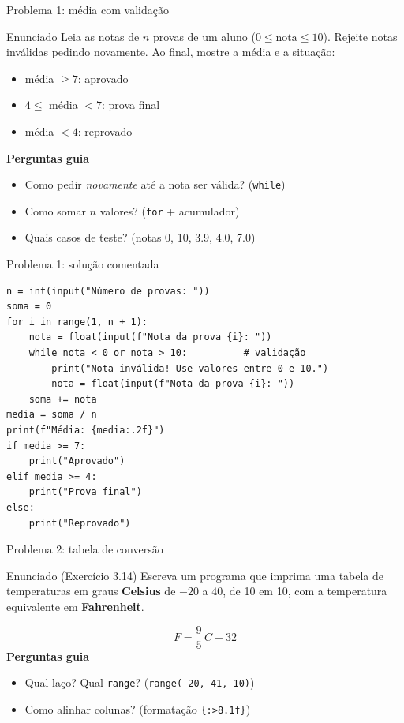 \documentclass[aspectratio=169,10pt,t]{beamer}
\begin{document}
\begin{frame}{Problema 1: média com validação}
  \begin{exampleblock}{Enunciado}
    Leia as notas de \(n\) provas de um aluno (\(0 \le \text{nota} \le 10\)). Rejeite notas inválidas pedindo novamente. Ao final, mostre a média e a situação:
    \begin{itemize}\small
      \item média \(\ge 7\): aprovado
      \item \(4 \le\) média \(< 7\): prova final
      \item média \(< 4\): reprovado
    \end{itemize}
  \end{exampleblock}
  \textbf{Perguntas guia}
  \begin{itemize}
    \item Como pedir \emph{novamente} até a nota ser válida? \hfill (\texttt{while})
    \item Como somar \(n\) valores? \hfill (\texttt{for} + acumulador)
    \item Quais casos de teste? \hfill (notas 0, 10, 3.9, 4.0, 7.0)
  \end{itemize}
\end{frame}

\begin{frame}[fragile]{Problema 1: solução comentada}
\begin{lstlisting}
n = int(input("Número de provas: "))
soma = 0
for i in range(1, n + 1):
    nota = float(input(f"Nota da prova {i}: "))
    while nota < 0 or nota > 10:          # validação
        print("Nota inválida! Use valores entre 0 e 10.")
        nota = float(input(f"Nota da prova {i}: "))
    soma += nota
media = soma / n
print(f"Média: {media:.2f}")
if media >= 7:
    print("Aprovado")
elif media >= 4:
    print("Prova final")
else:
    print("Reprovado")
\end{lstlisting}
\end{frame}

\begin{frame}{Problema 2: tabela de conversão}
  \begin{exampleblock}{Enunciado (Exercício 3.14)}
    Escreva um programa que imprima uma tabela de temperaturas em graus \textbf{Celsius} de \(-20\) a \(40\), de 10 em 10, com a temperatura equivalente em \textbf{Fahrenheit}.
  \end{exampleblock}
  \[ F = \frac{9}{5}\,C + 32 \]
  \textbf{Perguntas guia}
  \begin{itemize}
    \item Qual laço? Qual \texttt{range}? \hfill (\texttt{range(-20, 41, 10)})
    \item Como alinhar colunas? \hfill (formatação \texttt{\{:>8.1f\}})
  \end{itemize}
\end{frame}
\end{document}
